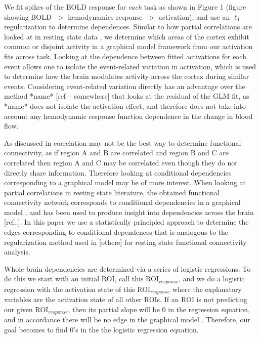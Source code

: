 \documentclass[12pt]{article}
\begin{document}
We fit spikes of the BOLD response for \emph{each} task as shown in Figure 1 (figure showing BOLD -$>$ hemodynamics response -$>$ activation), and use an $\ell_1$ regularization \cite{ravikumar2010high} to determine dependences.  Similar to how partial correlations are looked at in resting state data \cite{ryali2012estimation}, we determine which areas of the cortex exhibit common or disjoint activity in a graphical model framework from our activation fits across task. Looking at the dependence between fitted activations for each event allows one to isolate the event-related variation in activation, which is used to determine how the brain modulates activity across the cortex during similar events.  Considering event-related variation directly has an advantage over the method *name* [ref -- somewhere] that looks at the residual of the GLM fit, as *name* does not isolate the activation effect, and therefore does not take into account any hemodynamic response function dependence in the change in blood flow.

As discussed in \cite{smith2012future} correlation may not be the best way to determine functional connectivity, as if region A and B are correlated and region B and C are correlated then region A and C may be correlated even though they do not directly share information.  Therefore looking at conditional dependencies corresponding to a graphical model may be of more interest.  When looking at partial correlations in resting state literature, the obtained functional connectivity network corresponds to  conditional dependencies in a graphical model \cite{lauritzen1996graphical},  and has been used to produce insight into dependencies across the brain [ref..].  In this paper we use a statistically principled approach to determine the edges corresponding to conditional dependences that is analogous to the regularization method used in \cite{ryali2012estimation} [others] for resting state functional connectivity analysis.  %



Whole-brain dependencies are determined via a series of logistic regressions.  To do this we start with an initial ROI, call this ROI$_{response}$, and we do a logistic regression with the activation state of this ROI$_{response}$ where the explanatory variables are the activation state of all other ROIs.   If an ROI is not predicting our given ROI$_{response}$, then its partial slope will be 0 in the regression equation, and in accordance there will be no edge in the graphical model \cite{ravikumar2010high}.  Therefore, our goal becomes to find 0's in the the logistic regression equation.
\end{document}
